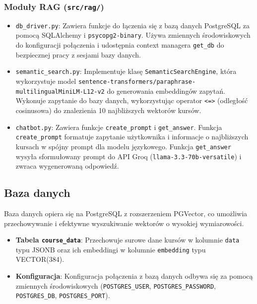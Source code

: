 \documentclass{article}
\begin{document}
\subsubsection{Moduły RAG (\texttt{src/rag/})}
\begin{itemize}
    \item \texttt{db\_driver.py}: Zawiera funkcje do łączenia się z bazą danych PostgreSQL za pomocą SQLAlchemy i \texttt{psycopg2-binary}. Używa zmiennych środowiskowych do konfiguracji połączenia i udostępnia context managera \texttt{get\_db} do bezpiecznej pracy z sesjami bazy danych.
    \item \texttt{semantic\_search.py}: Implementuje klasę \texttt{SemanticSearchEngine}, która wykorzystuje model \texttt{sentence-transformers/paraphrase-multilingual\allowbreak MiniLM-L12-v2} do generowania embeddingów zapytań. Wykonuje zapytanie do bazy danych, wykorzystując operator \texttt{<=>} (odległość cosinusowa) do znalezienia 10 najbliższych wektorów kursów.
    \item \texttt{chatbot.py}: Zawiera funkcje \texttt{create\_prompt} i \texttt{get\_answer}. Funkcja \\\texttt{create\_prompt} formatuje zapytanie użytkownika i informacje o najbliższych kursach w spójny prompt dla modelu językowego. Funkcja \texttt{get\_answer} wysyła sformułowany prompt do API Groq (\texttt{llama-3.3-70b-versatile}) i zwraca wygenerowaną odpowiedź.
\end{itemize}

\subsection{Baza danych}
Baza danych opiera się na PostgreSQL z rozszerzeniem PGVector, co umożliwia przechowywanie i efektywne wyszukiwanie wektorów o wysokiej wymiarowości.
\begin{itemize}
    \item \textbf{Tabela \texttt{course\_data}}: Przechowuje surowe dane kursów w kolumnie \texttt{data} typu JSONB oraz ich embeddingi w kolumnie \texttt{embedding} typu VECTOR(384).
    \item \textbf{Konfiguracja}: Konfiguracja połączenia z bazą danych odbywa się za pomocą zmiennych środowiskowych (\texttt{POSTGRES\_USER}, \texttt{POSTGRES\_PASSWORD}, \texttt{POSTGRES\_DB}, \texttt{POSTGRES\_PORT}).
\end{itemize}
\end{document}
